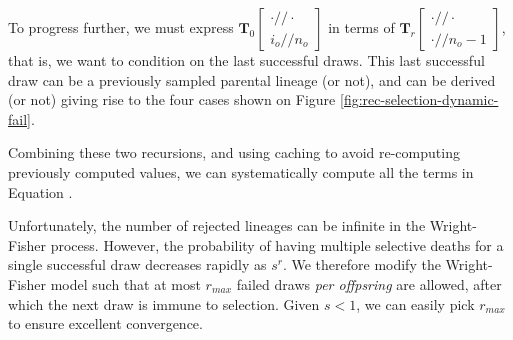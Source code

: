 \documentclass[review]{elsarticle}
\newcommand{\dslash}{/\!\!/}
\newcommand{\Coalc}[4]{\begin{bmatrix}#1\dslash #2 \\ #3\dslash #4 \end{bmatrix}}
\newcommand{\sgcomment}[1]{{\color{red}{SG: #1}}}
\begin{document}
  To progress further, we must express $\mathbf{T}_{0}\Coalc{\cdot}{\cdot}{i_o}{n_o}$ in terms of $\mathbf{T}_{r}\Coalc{\cdot}{\cdot}{\cdot}{n_o-1}$,
  that is, we want to condition on the last successful draws. This last successful draw can be a previously sampled parental lineage (or not), and can be derived (or not)
  giving rise to the four cases shown on Figure \ref{fig:rec-selection-dynamic-fail}. 
  
  Combining these two recursions, and using caching to avoid re-computing previously computed values, we can systematically compute all the terms in Equation \sgcomment{blah}.




Unfortunately, the number of rejected lineages can be infinite in the Wright-Fisher process. However, the probability of having multiple selective deaths for a single successful
draw  decreases rapidly as $s^r.$
We therefore modify the Wright-Fisher model such that at most $r_{max}$ failed draws \emph{per offpsring} are allowed, after which the next draw is immune to selection. 
Given $s<1$, we can easily pick $r_{max}$ to ensure excellent convergence.

   

\end{document}
